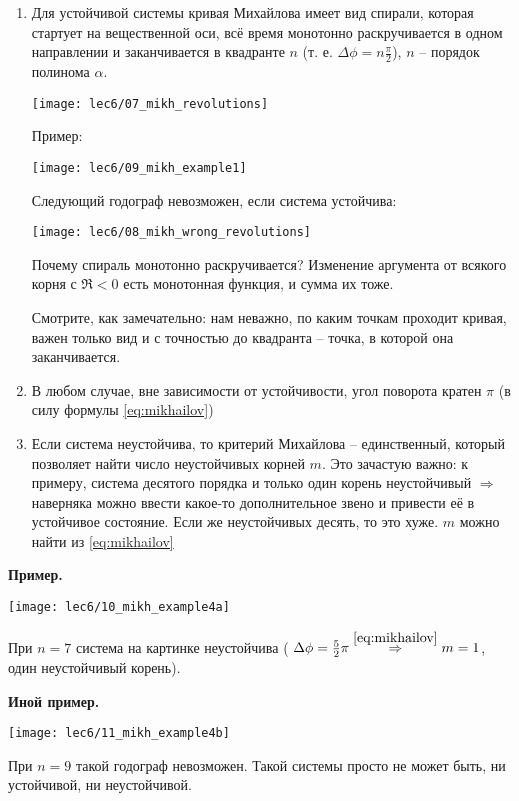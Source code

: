 \documentclass[main.tex]{subfiles}
\begin{document}
\begin{enumerate}[noitemsep]
	\item Для устойчивой системы кривая Михайлова имеет вид спирали, которая стартует на вещественной оси, всё время монотонно раскручивается в одном направлении и заканчивается в квадранте $ n $ (т. е. $ \Delta \phi = n\frac{\pi}{2} $), $n$ -- порядок полинома $\alpha$.

    \texttt{[image: lec6/07\_mikh\_revolutions]}

    Пример:

    \texttt{[image: lec6/09\_mikh\_example1]}

    Следующий годограф невозможен, если система устойчива:

    \texttt{[image: lec6/08\_mikh\_wrong\_revolutions]}

	Почему спираль монотонно раскручивается?
	Изменение аргумента от всякого корня с $ \Re < 0 $ есть монотонная функция, и сумма их тоже.

    Смотрите, как замечательно:
    нам неважно, по каким точкам проходит кривая, важен только вид и с точностью до квадранта -- точка, в которой она заканчивается.
	\item В любом случае, вне зависимости от устойчивости, угол поворота кратен $ \pi $ (в силу формулы \eqref{eq:mikhailov})
	\item Если система неустойчива, то критерий Михайлова -- единственный, который позволяет найти число неустойчивых корней $ m $.
    Это зачастую важно: к примеру, система десятого порядка и только один корень неустойчивый $ \Rightarrow $ наверняка можно ввести какое-то дополнительное звено и привести её в устойчивое состояние.
    Если же неустойчивых десять, то это хуже.
	$m$ можно найти из \eqref{eq:mikhailov}
\end{enumerate}

\textbf{Пример.}

\texttt{[image: lec6/10\_mikh\_example4a]}

При $ n = 7 $ система на картинке неустойчива ( $ \Delta \phi = \frac{5}{2} \pi \overset{\eqref{eq:mikhailov}}\Rightarrow m = 1 $, один неустойчивый корень).

\textbf{Иной пример.}

\texttt{[image: lec6/11\_mikh\_example4b]}

При $ n = 9 $ такой годограф невозможен.
Такой системы просто не может быть, ни устойчивой, ни неустойчивой.
\end{document}
